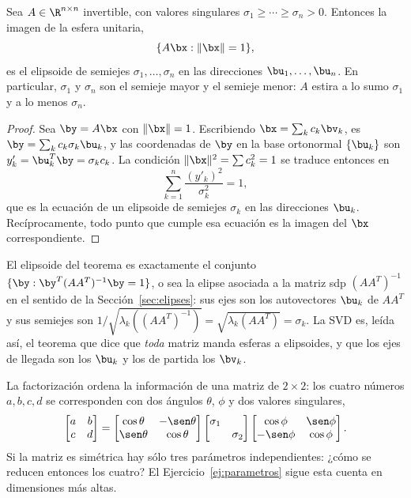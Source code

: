 \begin{theorem}\label{teo:elipsoide}
Sea $A\in\R^{n\times n}$ invertible, con valores singulares
$\sigma_1\ge\cdots\ge\sigma_n>0$. Entonces la imagen de la esfera unitaria,
\[
\{A\bx : \|\bx\|=1\} ,
\]
es el elipsoide de semiejes $\sigma_1,\dots,\sigma_n$ en las direcciones
$\bu_1,\dots,\bu_n$. En particular, $\sigma_1$ y $\sigma_n$ son el semieje
mayor y el semieje menor: $A$ estira a lo sumo $\sigma_1$ y a lo menos
$\sigma_n$.
\end{theorem}

\begin{proof}
Sea $\by=A\bx$ con $\|\bx\|=1$. Escribiendo $\bx=\sum_k c_k\bv_k$, es
$\by=\sum_k c_k\sigma_k\bu_k$, y las coordenadas de $\by$ en la base
ortonormal $\{\bu_k\}$ son $y'_k=\bu_k^T\by=\sigma_kc_k$. La condición
$\|\bx\|^2=\sum c_k^2=1$ se traduce entonces en
\[
\sum_{k=1}^n\frac{(y'_k)^2}{\sigma_k^2}=1 ,
\]
que es la ecuación de un elipsoide de semiejes $\sigma_k$ en las direcciones
$\bu_k$. Recíprocamente, todo punto que cumple esa ecuación es la imagen del
$\bx$ correspondiente.
\end{proof}

\begin{remark}
El elipsoide del teorema es exactamente el conjunto
$\{\by : \by^T(AA^T)^{-1}\by=1\}$, o sea la elipse asociada a la matriz sdp
$(AA^T)^{-1}$ en el sentido de la Sección~\ref{sec:elipses}: sus ejes son los
autovectores $\bu_k$ de $AA^T$ y sus semiejes son
$1/\sqrt{\lambda_k((AA^T)^{-1})}=\sqrt{\lambda_k(AA^T)}=\sigma_k$. La SVD es,
leída así, el teorema que dice que \emph{toda} matriz manda esferas a
elipsoides, y que los ejes de llegada son los $\bu_k$ y los de partida los
$\bv_k$.
\end{remark}

\begin{remark}
La factorización ordena la información de una matriz de $2\times2$: los cuatro
números $a,b,c,d$ se corresponden con dos ángulos $\theta$, $\phi$ y dos
valores singulares,
\[
\begin{bmatrix}a&b\\ c&d\end{bmatrix}
=\begin{bmatrix}\cos\theta&-\sen\theta\\ \sen\theta&\cos\theta\end{bmatrix}
\begin{bmatrix}\sigma_1&\\ &\sigma_2\end{bmatrix}
\begin{bmatrix}\cos\phi&\sen\phi\\ -\sen\phi&\cos\phi\end{bmatrix} .
\]
Si la matriz es simétrica hay sólo tres parámetros independientes: ¿cómo se
reducen entonces los cuatro? El Ejercicio~\ref{ej:parametros} sigue esta
cuenta en dimensiones más altas.
\end{remark}

